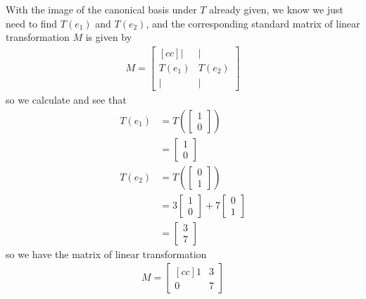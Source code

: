 \documentclass{amsart}
\theoremstyle{definition}
\theoremstyle{definition}
\DeclareMathOperator{\1}{\mathbbm{1}}
\begin{document}
\begin{enumerate}
	With the image of the canonical basis under $T$ already given, we know we just need to find $T(e_1)$ and $T(e_2)$, and the corresponding standard matrix of linear transformation $M$ is given by
	\begin{align*}
	M = \begin{bmatrix}[c c]
	| & | \\ T(e_1) & T(e_2) \\ | & |
	\end{bmatrix}
	\end{align*}
	so we calculate and see that
	\begin{align}
	\nonumber T(e_1) &= T\left( \begin{bmatrix} 1 \\ 0 \end{bmatrix} \right) \\
	\label{eq3} \tag{$\star \star$} &= \begin{bmatrix} 1 \\ 0 \end{bmatrix} \\
	\nonumber T(e_2) &= T\left( \begin{bmatrix} 0 \\ 1 \end{bmatrix} \right) \\
	\nonumber &= 3 \begin{bmatrix} 1 \\ 0 \end{bmatrix} + 7 \begin{bmatrix} 0 \\ 1 \end{bmatrix} \\
	\label{eq4} \tag{$\ast \ast$} &= \begin{bmatrix} 3 \\ 7 \end{bmatrix}
	\end{align}
	so we have the matrix of linear transformation
	\begin{align}
	\label{eq5}
	\tag{$\dagger$}
	M = \begin{bmatrix}[c c]
	1 & 3 \\ 0 & 7
	\end{bmatrix}
	\end{align}
\end{enumerate}
\end{document}
